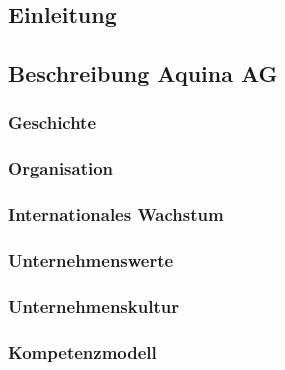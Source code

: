 \documentclass[../../main.tex]{subfiles}
\begin{document}
\subsection{Einleitung}


\subsection{Beschreibung Aquina AG}


\subsubsection{Geschichte}


\subsubsection{Organisation}


\subsubsection{Internationales Wachstum}


\subsubsection{Unternehmenswerte}


\subsubsection{Unternehmenskultur}

    
\subsubsection{Kompetenzmodell}

\end{document}
